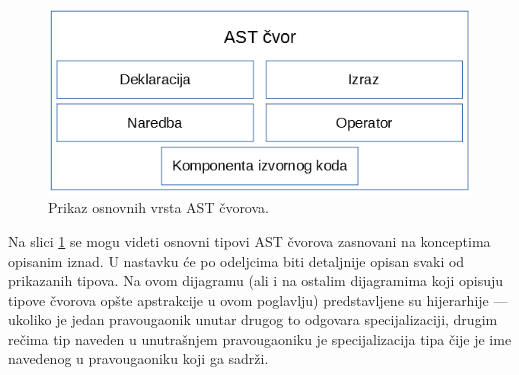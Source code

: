 \begin{figure}[h!]
\centering
\includegraphics[scale=0.6]{images/nodes.png}
\caption{Prikaz osnovnih vrsta AST čvorova.}
\label{fig:ASTNode}
\end{figure}

Na slici \ref{fig:ASTNode} se mogu videti osnovni tipovi AST čvorova zasnovani na konceptima opisanim iznad. U nastavku će po odeljcima biti detaljnije opisan svaki od prikazanih tipova. Na ovom dijagramu (ali i na ostalim dijagramima koji opisuju tipove čvorova opšte apstrakcije u ovom poglavlju) predstavljene su hijerarhije --- ukoliko je jedan pravougaonik unutar drugog to odgovara specijalizaciji, drugim rečima tip naveden u unutrašnjem pravougaoniku je specijalizacija tipa čije je ime navedenog u pravougaoniku koji ga sadrži.





